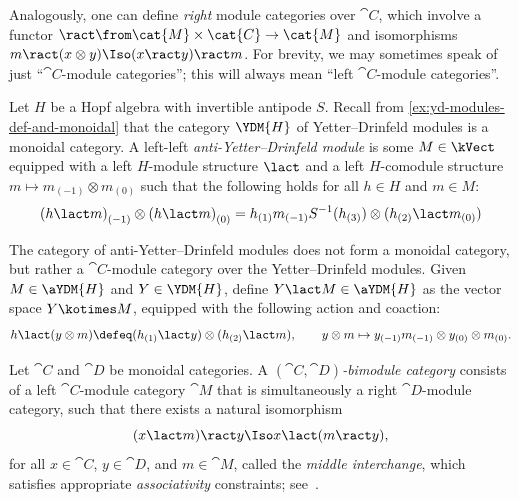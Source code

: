 Analogously,
one can define \emph{right} module categories over \(\cat{C}\),
which involve a functor \(\ract \from \cat{M} \times \cat{C} \to \cat{M}\) and isomorphisms
\(m \ract (x \otimes y) \Iso (x \ract y) \ract m\).
For brevity, we may sometimes speak of just ``\(\cat{C}\)\hyp{}module categories'';
this will always mean ``left \(\cat{C}\)\hyp{}module categories''.

\begin{example}\label{ex:ayd-def-as-modules-over-yd}
  Let \(H\) be a Hopf algebra with invertible antipode \(S\).
  Recall from \cref{ex:yd-modules-def-and-monoidal} that the category \(\YDM{H}\) of Yetter–Drinfeld modules is a monoidal category.
  A left-left \emph{anti\hyp{}Yetter–Drinfeld module} is some \(M \in \kVect\)
  equipped with a left \(H\)\hyp{}module structure \(\lact\)
  and a left \(H\)\hyp{}comodule structure \(m \mapsto m_{(-1)} \otimes m_{(0)}\)
  such that
  the following holds for all \(h \in H\) and \(m \in M\):%
  \[
    {(h \lact m)}_{(-1)} \otimes {(h \lact m)}_{(0)} = h_{(1)}m_{(-1)}S^{-1}(h_{(3)}) \otimes (h_{(2)} \lact m_{(0)})
  \]

  The category of anti\hyp{}Yetter–Drinfeld modules does not form a monoidal category, but rather a \(\cat{C}\)\hyp{}module category over the Yetter–Drinfeld modules.
  Given \(M \in \aYDM{H}\) and \(Y \in \YDM{H}\),
  define \(Y \lact M \in \aYDM{H}\) as the vector space \(Y \kotimes M\),
  equipped with the following action and coaction:
  \[
    h \lact (y \otimes m) \defeq (h_{(1)} \lact y) \otimes (h_{(2)} \lact m),
    \qquad
    y \otimes m \mapsto y_{(-1)}m_{(-1)} \otimes y_{(0)} \otimes m_{(0)}.
  \]
\end{example}

\begin{definition}\label{def:bimodule-category}
  Let \(\cat{C}\) and \(\cat{D}\) be monoidal categories.
  A \emph{\((\cat{C}, \cat{D})\)\hyp{}bimodule category} consists of a left \(\cat{C}\)\hyp{}module category \(\cat{M}\) that
  is simultaneously a right \(\cat{D}\)\hyp{}module category, such that there exists a natural isomorphism
  \[
    (x \lact m) \ract y \Iso x \lact (m \ract y),
  \]
  for all \(x \in \cat{C}\), \(y \in \cat{D}\), and \(m \in \cat{M}\),
  called the \emph{middle interchange},
  which satisfies appropriate \emph{associativity} constraints;
  see~\cite[Definition~7.1.7]{Etingof2015}.
\end{definition}

